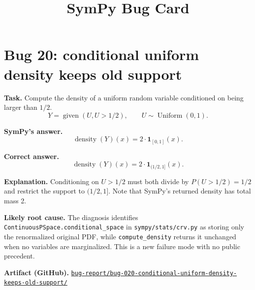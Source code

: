 \documentclass[11pt]{article}
\title{SymPy Bug Card}
\author{}
\date{}
\newcommand{\artifactrepo}{https://github.com/TODO-org/TODO-repo}
\newcommand{\bugbundle}[1]{\href{\artifactrepo/tree/main/bug-report/#1}{\nolinkurl{bug-report/#1/}}}
\begin{document}
\maketitle

\section*{Bug 20: conditional uniform density keeps old support}

\begin{counterexamplebox}
\textbf{Task.} Compute the density of a uniform random variable conditioned on
being larger than \(1/2\).
\[
Y=\operatorname{given}(U,U>1/2),\qquad U\sim\operatorname{Uniform}(0,1).
\]

\medskip
\textbf{SymPy's answer.} \[
\operatorname{density}(Y)(x)
=2\cdot\mathbf{1}_{[0,1]}(x).
\]

\medskip
\textbf{Correct answer.} \[
\operatorname{density}(Y)(x)
=2\cdot\mathbf{1}_{(1/2,1]}(x).
\]

\medskip
\textbf{Explanation.} Conditioning on \(U>1/2\) must both divide by
\(P(U>1/2)=1/2\) and restrict the support to \((1/2,1]\). Note that SymPy's returned
density has total mass 2.

\medskip
\textbf{Likely root cause.} The diagnosis identifies
\texttt{ContinuousPSpace.conditional\_space} in \nolinkurl{sympy/stats/crv.py}
as storing only the renormalized original PDF, while
\texttt{compute\_density} returns it unchanged when no variables are
marginalized.  This is a new failure mode with no public precedent.

\medskip
\textbf{Artifact (GitHub).} \bugbundle{bug-020-conditional-uniform-density-keeps-old-support}
\end{counterexamplebox}
\end{document}
